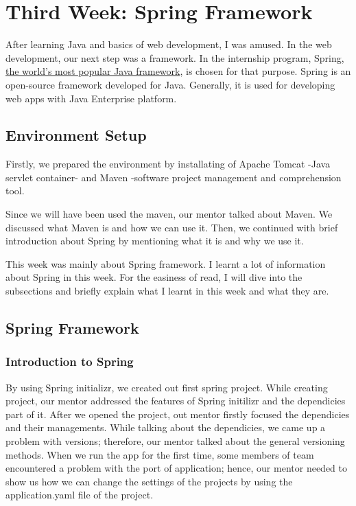 \section{Third Week: Spring Framework}

After learning Java and basics of web development, I was amused. In the web development, our next step was a framework. In the internship program, Spring, \href{https://spring.io/why-spring}{the world's most popular Java framework}, is chosen for that purpose. Spring is an open-source framework developed for Java. Generally, it is used for developing web apps with Java Enterprise platform.

\subsection{Environment Setup}

Firstly, we prepared the environment by installating of Apache Tomcat -Java servlet container- and Maven -software project management and comprehension tool. 

Since we will have been used the maven, our mentor talked about Maven. We discussed what Maven is and how we can use it. Then, we continued with brief introduction about Spring by mentioning what it is and why we use it.

This week was mainly about Spring framework. I learnt a lot of information about Spring in this week. For the easiness of read, I will dive into the subsections and briefly explain what I learnt in this week and what they are.

\subsection{Spring Framework}

\subsubsection{Introduction to Spring}

By using Spring initializr, we created out first spring project. While creating project, our mentor addressed the features of Spring initilizr and the dependicies part of it. After we opened the project, out mentor firstly focused the dependicies and their managements. While talking about the dependicies, we came up a problem with versions; therefore, our mentor talked about the general versioning methods. When we run the app for the first time, some members of team encountered a problem with the port of application; hence, our mentor needed to show us how we can change the settings of the projects by using the application.yaml file of the project.


